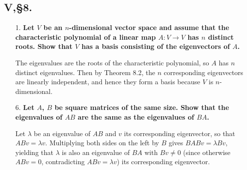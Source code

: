 \documentclass[12pt]{article}
\begin{document}
\subsection*{V,\S8.}
\begin{enumerate}
    \item[1.]
        \boldmath\textbf{Let $V$ be an $n$-dimensional vector space and assume that the characteristic polynomial of a linear map $A : V \to V$ has $n$ distinct roots. Show that $V$ has a basis consisting of the eigenvectors of $A$.
        }\unboldmath \par
        The eigenvalues are the roots of the characteristic polynomial, so $A$ has $n$ distinct eigenvalues. Then by Theorem 8.2, the $n$ corresponding eigenvectors are linearly independent, and hence they form a basis because $V$ is $n$-dimensional.

    \item[6.]
        \boldmath\textbf{Let $A$, $B$ be square matrices of the same size. Show that the eigenvalues of $AB$ are the same as the eigenvalues of $BA$.
        }\unboldmath \par
        Let $\lambda$ be an eigenvalue of $AB$ and $v$ its corresponding eigenvector, so that $ABv = \lambda v$. Multiplying both sides on the left by $B$ gives $BABv = \lambda Bv$, yielding that $\lambda$ is also an eigenvalue of $BA$ with $Bv \neq 0$ (since otherwise $ABv = 0$, contradicting $ABv = \lambda v$) its corresponding eigenvector.


\end{enumerate}
\end{document}
